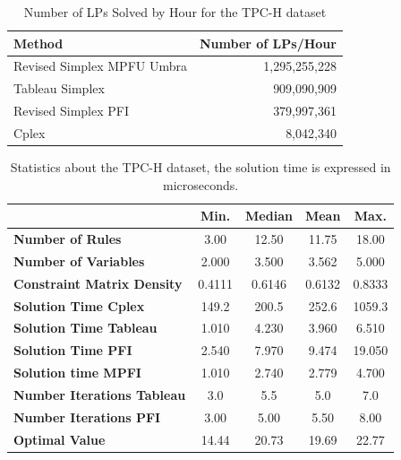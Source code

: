 \begin{table}[!htb]
    \centering
    \caption{Number of LPs Solved by Hour for the TPC-H dataset}
    \begin{tabular}{l|r}
        \toprule
        Method                     & Number of LPs/Hour \\
        \midrule
        Revised Simplex MPFU Umbra & 1,295,255,228      \\
        Tableau Simplex            & 909,090,909        \\
        Revised Simplex PFI        & 379,997,361        \\
        Cplex                      & 8,042,340          \\
        \bottomrule
    \end{tabular}
    \label{table_lps_hr_tpch}
\end{table}
\begin{table}
    \centering
    \caption{Statistics about the TPC-H dataset, the solution time is expressed in microseconds.}
    \begin{tabular}{lcccc}
        \toprule
                                           & \textbf{Min.} & \textbf{Median} & \textbf{Mean} & \textbf{Max.} \\
        \midrule
        \textbf{Number of Rules}           & 3.00          & 12.50           & 11.75         & 18.00         \\
        \textbf{Number of Variables}       & 2.000         & 3.500           & 3.562         & 5.000         \\
        \textbf{Constraint Matrix Density} & 0.4111        & 0.6146          & 0.6132        & 0.8333        \\
        \textbf{Solution Time Cplex}       & 149.2         & 200.5           & 252.6         & 1059.3        \\
        \textbf{Solution Time Tableau}     & 1.010         & 4.230           & 3.960         & 6.510         \\
        \textbf{Solution Time PFI}         & 2.540         & 7.970           & 9.474         & 19.050        \\
        \textbf{Solution time MPFI}        & 1.010         & 2.740           & 2.779         & 4.700         \\
        \textbf{Number Iterations Tableau} & 3.0           & 5.5             & 5.0           & 7.0           \\
        \textbf{Number Iterations PFI}     & 3.00          & 5.00            & 5.50          & 8.00          \\
        \textbf{Optimal Value}             & 14.44         & 20.73           & 19.69         & 22.77         \\
        \bottomrule
    \end{tabular}
    \label{stat_tpch}
\end{table}
